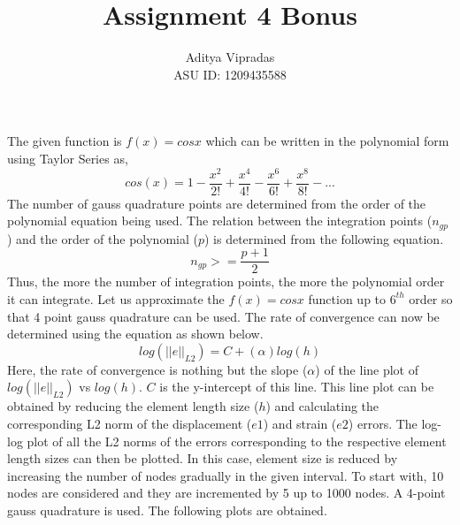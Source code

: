 \documentclass[12pt]{article}
\title{\textbf{Assignment 4 Bonus}}
\author{Aditya Vipradas\\ASU ID: 1209435588}
\begin{document}
\maketitle

The given function is $f(x) = cos x$ which can be written in the polynomial form using Taylor Series as,
\begin{equation}
cos(x) = 1 - \frac{x^{2}}{2!} + \frac{x^{4}}{4!} - \frac{x^{6}}{6!} + \frac{x^{8}}{8!} - ...
\end{equation}
The number of gauss quadrature points are determined from the order of the polynomial equation being used. The relation between the integration points ($n_{gp}$) and the order of the polynomial ($p$) is determined from the following equation.
\begin{equation}
n_{gp} >= \frac{p+1}{2}
\end{equation}
Thus, the more the number of integration points, the more the polynomial order it can integrate. Let us approximate the $f(x) = cos x$ function up to $6^{th}$ order so that 4 point gauss quadrature can be used. The rate of convergence can now be determined using the equation as shown below.
\begin{equation}
log(||e||_{L2}) = C + (\alpha)log(h)
\end{equation}
Here, the rate of convergence is nothing but the slope ($\alpha$) of the line plot of $log(||e||_{L2})$ vs $log(h)$. $C$ is the y-intercept of this line. This line plot can be obtained by reducing the element length size ($h$) and calculating the corresponding L2 norm of the displacement ($e1$) and strain ($e2$) errors. The log-log plot of all the L2 norms of the errors corresponding to the respective element length sizes can then be plotted. In this case, element size is reduced by increasing the number of nodes gradually in the given interval. To start with, 10 nodes are considered and they are incremented by 5 up to 1000 nodes. A 4-point gauss quadrature is used. The following plots are obtained.
\end{document}
